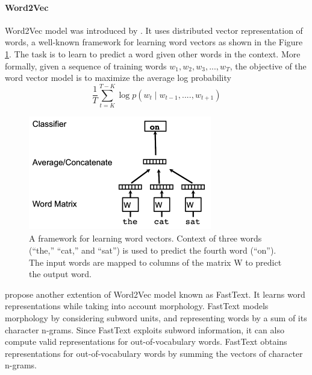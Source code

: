 \paragraph{Word2Vec} Word2Vec model was  introduced by \cite{mikolov2013efficient}. It uses distributed vector representation of words, a well-known framework for learning word vectors as shown in the Figure \ref{fig:Word2Vec model}. The task is to learn to predict a word given other words in the context.
More formally, given a sequence of training words
$w_{1}, w_{2}, w_{3}, ..., w_{T} $, the objective of the word vector model is to maximize the average log probability
\\
\begin{equation}
\frac{1}{T} \sum_{t=K}^{T-K} \log p(w_{t} \mid w_{t-1},....,w_{t+1}) 
\end{equation}

\begin{figure}[h]
	\centering
	\includegraphics[width=8cm, height=5cm]{w2v.png}
	\caption{A framework for learning word vectors. Context of
		three words (“the,” “cat,” and “sat”) is used to predict the fourth
		word (“on”). The input words are mapped to columns of the matrix
		W to predict the output word.}
	\label{fig:Word2Vec model}
\end{figure}


 \cite{bojanowski2016enriching} propose another extention of Word2Vec model known as FastText. It learns word
 representations while taking into account morphology.
 FastText models morphology by considering subword
 units, and representing words by a sum of its character
 n-grams.  Since FastText exploits subword information, it can also
 compute valid representations for out-of-vocabulary
 words. FastText obtains representations for out-of-vocabulary words by summing the vectors of character
 n-grams.
  
